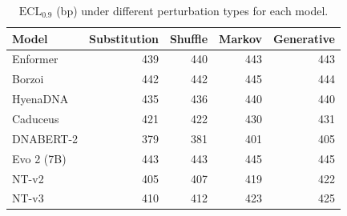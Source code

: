 \begin{table}[t]
\centering
\caption{$\mathrm{ECL}_{0.9}$ (bp) under different perturbation types for each model.}
\label{tab:perturbation_sensitivity}
\begin{tabular}{lrrrr}
\toprule
Model & Substitution & Shuffle & Markov & Generative \\
\midrule
Enformer & 439 & 440 & 443 & 443 \\
Borzoi & 442 & 442 & 445 & 444 \\
HyenaDNA & 435 & 436 & 440 & 440 \\
Caduceus & 421 & 422 & 430 & 431 \\
DNABERT-2 & 379 & 381 & 401 & 405 \\
Evo 2 (7B) & 443 & 443 & 445 & 445 \\
NT-v2 & 405 & 407 & 419 & 422 \\
NT-v3 & 410 & 412 & 423 & 425 \\
\bottomrule
\end{tabular}
\end{table}
